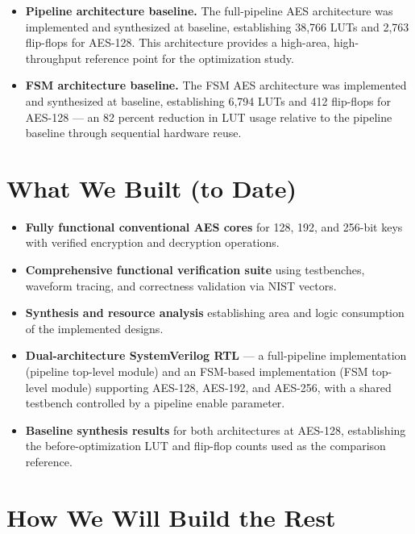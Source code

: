 \begin{itemize}
  \item \textbf{Pipeline architecture baseline.}
        The full-pipeline AES architecture was implemented and synthesized at baseline,
        establishing 38,766 LUTs and 2,763 flip-flops for AES-128. This architecture
        provides a high-area, high-throughput reference point for the optimization study.

  \item \textbf{FSM architecture baseline.}
        The FSM AES architecture was implemented and synthesized at baseline, establishing
        6,794 LUTs and 412 flip-flops for AES-128 --- an 82 percent reduction in LUT usage
        relative to the pipeline baseline through sequential hardware reuse.
\end{itemize}


\section{What We Built (to Date)}

\begin{itemize}
  \item \textbf{Fully functional conventional AES cores} for 128, 192, and 256-bit keys with
        verified encryption and decryption operations.
  \item \textbf{Comprehensive functional verification suite} using testbenches, waveform tracing,
        and correctness validation via NIST vectors.
  \item \textbf{Synthesis and resource analysis} establishing area and logic consumption of the
        implemented designs.
  \item \textbf{Dual-architecture SystemVerilog RTL} --- a full-pipeline implementation
        (pipeline top-level module) and an FSM-based implementation (FSM top-level module)
        supporting AES-128, AES-192, and AES-256, with a shared testbench controlled by
        a pipeline enable parameter.
  \item \textbf{Baseline synthesis results} for both architectures at AES-128, establishing
        the before-optimization LUT and flip-flop counts used as the comparison reference.
\end{itemize}


\section{How We Will Build the Rest}

